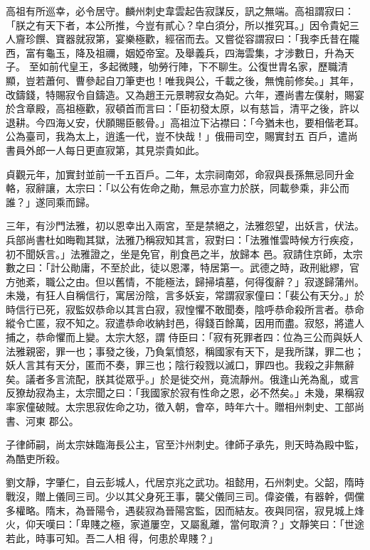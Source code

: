 \begin{pinyinscope}
 高祖有所巡幸，必令居守。麟州刺史韋雲起告寂謀反，訊之無端。高祖謂寂曰：「朕之有天下者，本公所推，今豈有貳心？皁白須分，所以推究耳。」因令貴妃三人齎珍饌、寶器就寂第，宴樂極歡，經宿而去。又嘗從容謂寂曰：「我李氏昔在隴西，富有龜玉，降及祖禰，姻婭帝室。及舉義兵，四海雲集，才涉數日，升為天子。
 至如前代皇王，多起微賤，劬勞行陣，下不聊生。公復世胄名家，歷職清顯，豈若蕭何、曹參起自刀筆吏也！唯我與公，千載之後，無愧前修矣。」其年，改鑄錢，特賜寂令自鑄造。又為趙王元景聘寂女為妃。六年，遷尚書左僕射，賜宴於含章殿，高祖極歡，寂頓首而言曰：「臣初發太原，以有慈旨，清平之後，許以退耕。今四海乂安，伏願賜臣骸骨。」高祖泣下沾襟曰：「今猶未也，要相偕老耳。公為臺司，我為太上，逍遙一代，豈不快哉！」俄冊司空，賜實封五
 百戶，遣尚書員外郎一人每日更直寂第，其見崇貴如此。



 貞觀元年，加實封並前一千五百戶。二年，太宗祠南郊，命寂與長孫無忌同升金輅，寂辭讓，太宗曰：「以公有佐命之勛，無忌亦宣力於朕，同載參乘，非公而誰？」遂同乘而歸。



 三年，有沙門法雅，初以恩幸出入兩宮，至是禁絕之，法雅怨望，出妖言，伏法。兵部尚書杜如晦鞫其獄，法雅乃稱寂知其言，寂對曰：「法雅惟雲時候方行疾疫，初不聞妖言。」法雅證之，坐是免官，削食邑之半，放歸本
 邑。寂請住京師，太宗數之曰：「計公勛庸，不至於此，徒以恩澤，特居第一。武德之時，政刑紕繆，官方弛紊，職公之由。但以舊情，不能極法，歸掃墳墓，何得復辭？」寂遂歸蒲州。未幾，有狂人自稱信行，寓居汾陰，言多妖妄，常謂寂家僮曰：「裴公有天分。」於時信行已死，寂監奴恭命以其言白寂，寂惶懼不敢聞奏，陰呼恭命殺所言者。恭命縱令亡匿，寂不知之。寂遣恭命收納封邑，得錢百餘萬，因用而盡。寂怒，將遣人捕之，恭命懼而上變。太宗大怒，謂
 侍臣曰：「寂有死罪者四：位為三公而與妖人法雅親密，罪一也；事發之後，乃負氣憤怒，稱國家有天下，是我所謀，罪二也；妖人言其有天分，匿而不奏，罪三也；陰行殺戮以滅口，罪四也。我殺之非無辭矣。議者多言流配，朕其從眾乎。」於是徙交州，竟流靜州。俄逢山羌為亂，或言反獠劫寂為主，太宗聞之曰：「我國家於寂有性命之恩，必不然矣。」未幾，果稱寂率家僮破賊。太宗思寂佐命之功，徵入朝，會卒，時年六十。贈相州刺史、工部尚書、河東
 郡公。



 子律師嗣，尚太宗妹臨海長公主，官至汴州刺史。律師子承先，則天時為殿中監，為酷吏所殺。



 劉文靜，字肇仁，自云彭城人，代居京兆之武功。祖懿用，石州刺史。父韶，隋時戰沒，贈上儀同三司。少以其父身死王事，襲父儀同三司。偉姿儀，有器幹，倜儻多權略。隋末，為晉陽令，遇裴寂為晉陽宮監，因而結友。夜與同宿，寂見城上烽火，仰天嘆曰：「卑賤之極，家道屢空，又屬亂離，當何取濟？」文靜笑曰：「世途若此，時事可知。吾二人相
 得，何患於卑賤？」




\end{pinyinscope}
